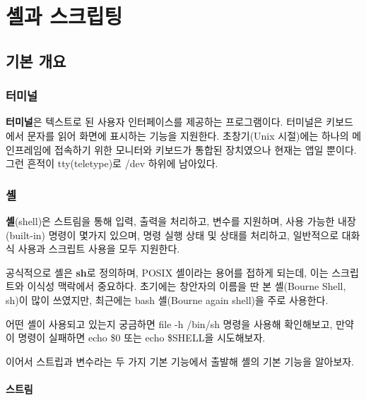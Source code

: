 \chapter{셸과 스크립팅}

\section{기본 개요}
\subsection*{터미널}
\begin{flushleft}
    \textbf{터미널}은 텍스트로 된 사용자 인터페이스를 제공하는 프로그램이다.
    터미널은 키보드에서 문자를 읽어 화면에 표시하는 기능을 지원한다.
    초창기(Unix 시절)에는 하나의 메인프레임에 접속하기 위한 모니터와 키보드가 통합된 장치였으나
    현재는 앱일 뿐이다.
    그런 흔적이 tty(teletype)로 /dev 하위에 남아있다.
\end{flushleft}

\subsection*{셸}
\begin{flushleft}
    \textbf{셸}(shell)은 스트림을 통해 입력, 출력을 처리하고, 변수를 지원하며,
    사용 가능한 내장(built-in) 명령이 몇가지 있으며, 명령 실행 상태 및 상태를 처리하고,
    일반적으로 대화식 사용과 스크립트 사용을 모두 지원한다.
\end{flushleft}

\begin{flushleft}
    공식적으로 셸은 \textbf{sh}로 정의하며, POSIX 셸이라는 용어를 접하게 되는데,
    이는 스크립트와 이식성 맥락에서 중요하다.
    초기에는 창안자의 이름을 딴 본 셸(Bourne Shell, sh)이 많이 쓰였지만,
    최근에는 bash 셸(Bourne again shell)을 주로 사용한다.
\end{flushleft}

\begin{flushleft}
    어떤 셸이 사용되고 있는지 궁금하면 file -h /bin/sh 명령을 사용해 확인해보고,
    만약 이 명령이 실패하면 echo \$0 또는 echo \$SHELL을 시도해보자.
\end{flushleft}

\begin{flushleft}
    이어서 스트립과 변수라는 두 가지 기본 기능에서 출발해
    셸의 기본 기능을 알아보자.
\end{flushleft}

\subsubsection*{스트림}


